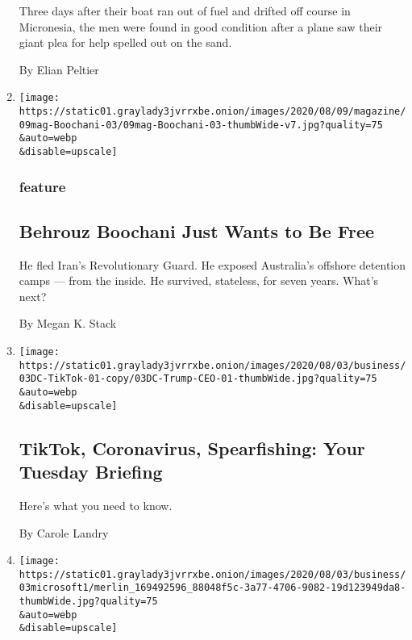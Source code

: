 \begin{enumerate}
  Three days after their boat ran out of fuel and drifted off course in
  Micronesia, the men were found in good condition after a plane saw
  their giant plea for help spelled out on the sand.

  By Elian Peltier
\item
  \href{/2020/08/04/magazine/behrouz-boochani-australia.html}{}

  \texttt{[image: https://static01.graylady3jvrrxbe.onion/images/2020/08/09/magazine/09mag-Boochani-03/09mag-Boochani-03-thumbWide-v7.jpg?quality=75\\\&auto=webp\\\&disable=upscale]}

  \hypertarget{feature}{%
  \subsubsection{feature}\label{feature}}

  \hypertarget{behrouz-boochani-just-wants-to-be-free}{%
  \subsection{Behrouz Boochani Just Wants to Be
  Free}\label{behrouz-boochani-just-wants-to-be-free}}

  He fled Iran's Revolutionary Guard. He exposed Australia's offshore
  detention camps --- from the inside. He survived, stateless, for seven
  years. What's next?

  By Megan K. Stack
\item
  \href{/2020/08/03/briefing/coronavirus-tiktok-afghanistan-australia.html}{}

  \texttt{[image: https://static01.graylady3jvrrxbe.onion/images/2020/08/03/business/03DC-TikTok-01-copy/03DC-Trump-CEO-01-thumbWide.jpg?quality=75\\\&auto=webp\\\&disable=upscale]}

  \hypertarget{tiktok-coronavirus-spearfishing-your-tuesday-briefing}{%
  \subsection{TikTok, Coronavirus, Spearfishing: Your Tuesday
  Briefing}\label{tiktok-coronavirus-spearfishing-your-tuesday-briefing}}

  Here's what you need to know.

  By Carole Landry
\item
  \href{/2020/08/03/technology/tiktok-microsoft-tweens.html}{}

  \texttt{[image: https://static01.graylady3jvrrxbe.onion/images/2020/08/03/business/03microsoft1/merlin\_169492596\_88048f5c-3a77-4706-9082-19d123949da8-thumbWide.jpg?quality=75\\\&auto=webp\\\&disable=upscale]}


\end{enumerate}
